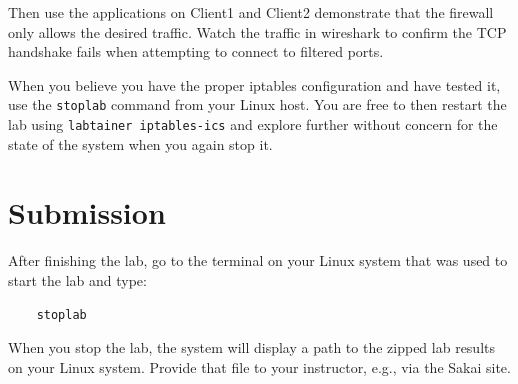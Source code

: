 Then use the applications on Client1 and Client2
demonstrate that the firewall only allows the desired traffic.
Watch the traffic in wireshark to confirm the TCP handshake fails
when attempting to connect to filtered ports.

When you believe you have the proper iptables configuration and have tested it,
use the {\tt stoplab} command from your Linux host.  You are free to then restart
the lab using {\tt labtainer iptables-ics} and explore further without concern for
the state of the system when you again stop it.
\section{Submission}
After finishing the lab, go to the terminal on your Linux system that was used to start the lab and type:
\begin{verbatim}
    stoplab 
\end{verbatim}
When you stop the lab, the system will display a path to the zipped lab results on your Linux system.  Provide that file to 
your instructor, e.g., via the Sakai site.

\copyrightnotice


